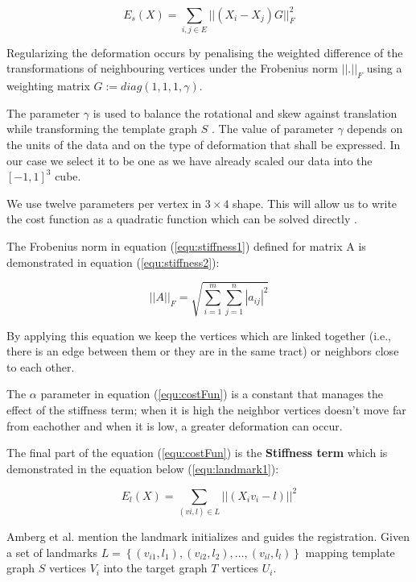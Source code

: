 \documentclass[../structure.tex]{subfiles}
\begin{document}
\begin{equation}
E_{s}(X) = \sum_{i,j \in E} ||(X_{i} - X_{j})G||_{F}^2
\label{equ:stiffness1}
\end{equation}

Regularizing the deformation occurs by penalising the weighted difference of the transformations of neighbouring vertices under the Frobenius norm $||.||_{F}$ using a weighting matrix $G := diag(1, 1, 1, \gamma)$.

The parameter $\gamma$ is used to balance the rotational and skew  against translation while transforming the template graph $S$ \cite{Amberg2007}. The value of parameter $\gamma$ depends on the units of the data and on the type of deformation that shall be expressed. In our case we select it to be one as we have already scaled our data into the $[-1, 1]^3$ cube.

We use twelve parameters per vertex in $3 \times 4$ shape. This will allow us to write the cost function as a quadratic function which can be solved directly \cite{Amberg2007}.

The Frobenius norm in equation (\ref{equ:stiffness1}) defined for matrix A is demonstrated in equation (\ref{equ:stiffness2}):

\begin{equation}
||A||_{F} = \sqrt{\sum_{i=1}^m \sum_{j=1}^n |a_{ij}|^2}
\label{equ:stiffness2}
\end{equation}

By applying this equation we keep the vertices which are linked together (i.e., there is an edge between them or they are in the same tract) or neighbors close to each other.

The $\alpha$ parameter in equation (\ref{equ:costFun}) is a constant that manages the effect of the stiffness term; when it is high the neighbor vertices doesn’t move far from eachother and when it is low, a greater deformation can occur.

The final part of the equation (\ref{equ:costFun}) is the \textbf{Stiffness term} which is demonstrated in the equation below (\ref{equ:landmark1}):

\begin{equation}
E_{l}(X) = \sum_{(vi,l) \in L}||(X_{i}v_{i} - l)||^2
\label{equ:landmark1}
\end{equation}

Amberg et al.  mention the landmark initializes and guides the registration. Given a set of landmarks $L = \left\{(v_{i1},l_{1}),(v_{i2},l_{2}),...,(v_{il},l_{l})\right\}$ mapping template graph $S$ vertices $V_{i}$ into the target graph $T$ vertices $U_{i}$.
\end{document}
